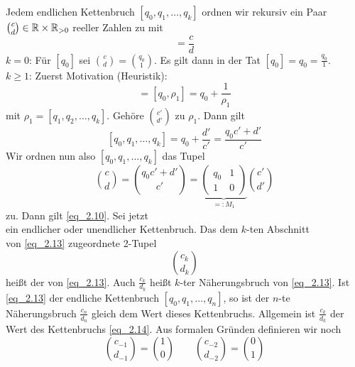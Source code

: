 \begin{defn}[Näherungsbruch] \label{def_2.5}
	Jedem endlichen Kettenbruch $[q_0,q_1,\dots,q_k]$ ordnen wir rekursiv ein Paar $\binom{c}{d} \in \mathbb{R} \times \mathbb{R}_{>0}$ reeller Zahlen zu mit
	\begin{equation}
		[q_0,q_1,\dots,q_k] = \frac{c}{d} \label{eq_2.10}
	\end{equation}
	$k = 0$: Für $[q_0]$ sei $\binom{c}{d} = \binom{q_0}{1}$. Es gilt dann in der Tat $[q_0] = q_0 = \frac{q_0}{1}$. \\
	$k \geq 1$: Zuerst Motivation (Heuristik):
	\begin{equation}
		[q_0,q_1,\dots,q_k] = [q_0,\rho_1] = q_0 + \frac{1}{\rho_1} \label{eq_2.11}
	\end{equation}
	mit $\rho_1 = [q_1,q_2,\dots,q_k]$. Gehöre $\binom{c'}{d'}$ zu $\rho_1$. Dann gilt
	\[ [q_0,q_1,\dots,q_k] = q_0 + \frac{d'}{c'} = \frac{q_0 c' + d'}{c'} \]
	Wir ordnen nun also $[q_0,q_1,\dots,q_k]$ das Tupel
	\begin{equation}
		\binom{c}{d} = \binom{q_0 c' + d'}{c'} = \underbrace{\begin{pmatrix}
		q_0 & 1 \\ 
		1 & 0
		\end{pmatrix}}_{=: M_1} \binom{c'}{d'} \label{eq_2.12}
	\end{equation}
	zu. Dann gilt \eqref{eq_2.10}. Sei jetzt
	\begin{equation}
		[q_0,q_1,\dots] \label{eq_2.13}
	\end{equation}
	ein endlicher oder unendlicher Kettenbruch. Das dem $k$-ten Abschnitt
	\begin{equation}
		[q_0,q_1,\dots,q_k] \label{eq_2.14}
	\end{equation}
	von \eqref{eq_2.13} zugeordnete 2-Tupel
	\begin{equation}
		\binom{c_k}{d_k} \label{eq_2.15}
	\end{equation}
	heißt der  von \eqref{eq_2.13}. Auch $\frac{c_k}{d_k}$ heißt $k$-ter Näherungsbruch von \eqref{eq_2.13}. Ist \eqref{eq_2.13} der endliche Kettenbruch $[q_0,q_1,\dots,q_n]$, so ist der $n$-te Näherungsbruch $\frac{c_n}{d_n}$ gleich dem Wert dieses Kettenbruchs. Allgemein ist $\frac{c_k}{d_k}$ der Wert des Kettenbruchs \eqref{eq_2.14}. Aus formalen Gründen definieren wir noch
	\begin{equation}
		\binom{c_{-1}}{d_{-1}} = \binom{1}{0} \qquad \binom{c_{-2}}{d_{-2}} = \binom{0}{1} \label{eq_2.16}
	\end{equation}
\end{defn}

